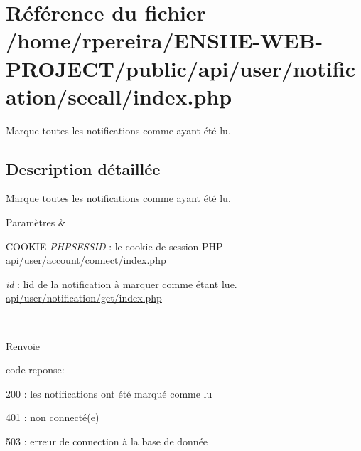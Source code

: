 \hypertarget{user_2notification_2seeall_2index_8php}{}\section{Référence du fichier /home/rpereira/\+E\+N\+S\+I\+I\+E-\/\+W\+E\+B-\/\+P\+R\+O\+J\+E\+C\+T/public/api/user/notification/seeall/index.php}
\label{user_2notification_2seeall_2index_8php}


Marque toutes les notifications comme ayant été lu.  




\subsection{Description détaillée}
Marque toutes les notifications comme ayant été lu. 


\begin{DoxyParams}{Paramètres}
{\em } & 
\begin{DoxyItemize}
\item C\+O\+O\+K\+IE {\itshape P\+H\+P\+S\+E\+S\+S\+ID} \+: le cookie de session P\+HP \hyperlink{user_2account_2connect_2index_8php}{api/user/account/connect/index.\+php}
\item {\itshape id} \+: l\textquotesingle{}id de la notification à marquer comme étant lue. \hyperlink{user_2notification_2get_2index_8php}{api/user/notification/get/index.\+php} 
\end{DoxyItemize}\\
\hline
\end{DoxyParams}
\begin{DoxyReturn}{Renvoie}

\begin{DoxyItemize}
\item code reponse\+:
\begin{DoxyItemize}
\item 200 \+: les notifications ont été marqué comme lu
\item 401 \+: non connecté(e)
\item 503 \+: erreur de connection à la base de donnée 
\end{DoxyItemize}
\end{DoxyItemize}
\end{DoxyReturn}
